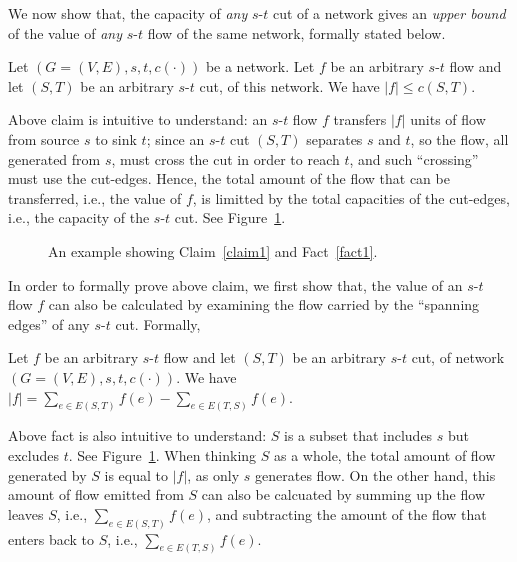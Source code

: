 
We now show that, the capacity of \emph{any} $s$-$t$ cut of a network
gives an \emph{upper bound} of the value of \emph{any} $s$-$t$ flow of the same network, 
formally stated below.
\begin{claim} \label{claim1}
Let $(G=(V, E), s, t, c(\cdot))$ be a network.
Let $f$ be an arbitrary $s$-$t$ flow and let $(S, T)$ be an arbitrary $s$-$t$ cut, of this network.
We have $|f| \le c(S, T)$.
\end{claim}

Above claim is intuitive to understand: an $s$-$t$ flow $f$ transfers $|f|$ units of flow from source $s$ to sink $t$;
since an $s$-$t$ cut $(S, T)$ separates $s$ and $t$, so the flow, all generated from $s$, must cross the cut in order to reach $t$,
and such ``crossing'' must use the cut-edges.
Hence, the total amount of the flow that can be transferred, i.e., the value of $f$, is limitted by
the total capacities of the cut-edges, i.e., the capacity of the $s$-$t$ cut.
See Figure~\ref{fig:claim}.

\begin{figure}[h]
\centering{}
\caption{An example showing Claim~\ref{claim1} and Fact~\ref{fact1}.}
\label{fig:claim}
\end{figure}


In order to formally prove above claim, we first show that, the value of an $s$-$t$ flow $f$
can also be calculated by examining the flow carried by the ``spanning edges'' of any $s$-$t$ cut.
Formally,
\begin{fact} \label{fact1}
Let $f$ be an arbitrary $s$-$t$ flow and let $(S, T)$ be an arbitrary $s$-$t$ cut, of network $(G=(V, E), s, t, c(\cdot))$.
We have $|f| = \sum_{e\in E(S, T)} f(e) - \sum_{e\in E(T, S)} f(e)$.
\end{fact}

Above fact is also intuitive to understand: $S$ is a subset that includes $s$ but excludes $t$.
See Figure~\ref{fig:claim}.
When thinking $S$ as a whole, 
the total amount of flow generated by $S$ is equal to $|f|$, as only $s$ generates flow.
On the other hand, this amount of flow emitted from $S$ 
can also be calcuated by summing up the flow leaves $S$, i.e., $\sum_{e\in E(S, T)} f(e)$,
and subtracting the amount of the flow that enters back to $S$, i.e., $\sum_{e\in E(T, S)} f(e)$.

